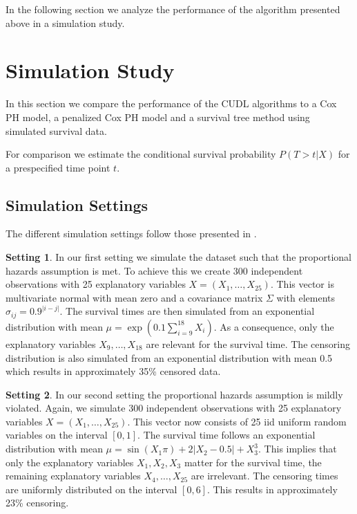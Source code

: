 \documentclass[12pt, a4paper]{scrartcl}
\theoremstyle{definition}
\newtheorem{setting}{Setting}
\theoremstyle{plain}
\numberwithin{equation}{section}
\numberwithin{figure}{section}
\numberwithin{table}{section}
\begin{document}
	In the following section we analyze the performance of the algorithm presented above in a simulation study.
	\newpage

	\section{Simulation Study} \label{simulation}
	In this section we compare the performance of the CUDL algorithms to a Cox PH model, a penalized Cox PH model and a survival tree method using simulated survival data.
	
	For comparison we estimate the conditional survival probability $P(T>t\vert X)$ for a prespecified time point $t$.
	
	\subsection{Simulation Settings}\label{settings}

	The different simulation settings follow those presented in \citet*{culs}.
	
	\begin{setting}
		In our first setting we simulate the dataset such that the proportional hazards assumption is met.
		To achieve this we create 300 independent observations with 25 explanatory variables $X=(X_1,\dots,X_{25})$.
		This vector is multivariate normal with mean zero and a covariance matrix $\Sigma$ with elements $\sigma_{ij}=0.9^{\vert i-j\vert}$.
		The survival times are then simulated from an exponential distribution with mean $\mu = \exp\left(0.1\sum_{i=9}^{18}X_i\right)$.
		As a consequence, only the explanatory variables $X_9,\dots,X_{18}$ are relevant for the survival time.
		The censoring distribution is also simulated from an exponential distribution with mean 0.5 which results in approximately 35\% censored data.
	\end{setting}

	\begin{setting}		
		In our second setting the proportional hazards assumption is mildly violated.
		Again, we simulate 300 independent observations with 25 explanatory variables $X=(X_1,\dots, X_{25})$.
		This vector now consists of 25 iid uniform random variables on the interval $[0,1]$.
		The survival time follows an exponential distribution with mean $\mu = \sin(X_1\pi)+2\vert X_2-0.5\vert + X_3^3$.
		This implies that only the explanatory variables $X_1,X_2,X_3$ matter for the survival time, the remaining explanatory variables $X_4,\dots,X_{25}$ are irrelevant.
		The censoring times are uniformly distributed on the interval $[0,6]$.
		This results in approximately 23\% censoring.
	\end{setting}
		
\end{document}
